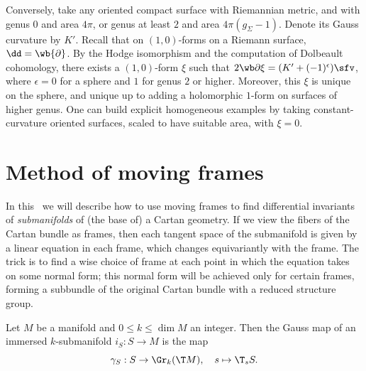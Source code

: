 Conversely, take any oriented compact surface with Riemannian metric, and with genus $0$ and area $4\pi$, or genus at least $2$ and area $4\pi (g_\varSigma-1)$. Denote its Gauss curvature by $K'$. Recall that on $(1,0)$-forms on a Riemann surface, $\dd=\wb{\partial}$. By the Hodge isomorphism and the computation of Dolbeault cohomology, there exists a $(1,0)$-form $\xi$ such that $2\wb\partial\xi=(K'+(-1)^\epsilon)\sfv$, where $\epsilon=0$ for a sphere and $1$ for genus $2$ or higher. Moreover, this $\xi$ is unique on the sphere, and unique up to adding a holomorphic $1$-form on surfaces of higher genus. One can build explicit homogeneous examples by taking constant-curvature oriented surfaces, scaled to have suitable area, with $\xi=0$.



\section{Method of moving frames}


In this \sect\ we will describe how to use moving frames to find differential invariants of \emph{submanifolds} of (the base of) a Cartan geometry. If we view the fibers of the Cartan bundle as frames, then each tangent space of the submanifold is given by a linear equation in each frame, which changes equivariantly with the frame. The trick is to find a wise choice of frame at each point in which the equation takes on some normal form; this normal form will be achieved only for certain frames, forming a subbundle of the original Cartan bundle with a reduced structure group.

\begin{defn}
    Let $M$ be a manifold and $0\leq k\leq \dim M$ an integer. Then the Gauss map of an immersed $k$-submanifold $i_S:S\to M$ is the map 
    \[\gamma_S:S\to \Gr_k (\T M),\quad s\mapsto \T_s S.\]
\end{defn}

